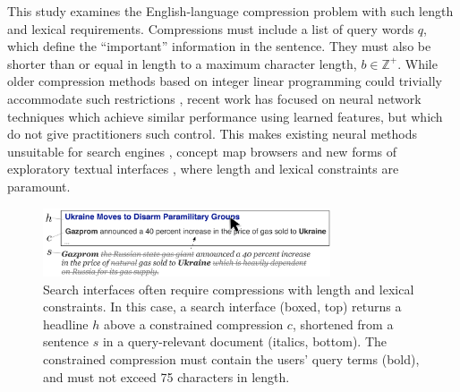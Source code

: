 \documentclass[11pt,a4paper]{article}
\begin{document}
This study examines the English-language compression problem with such length and lexical requirements. Compressions must include a list of query words $q$, which define the ``important'' information in the sentence. They must also be shorter than or equal in length to a maximum character length, $b \in \mathbb{Z}^{+}$. While older compression methods based on integer linear programming could trivially accommodate such restrictions \cite{clarke2008global,filippova2013overcoming}, recent work has focused on neural network techniques \cite{filippova2015sentence} which achieve similar performance using learned features, but which do not give practitioners such control. This makes existing neural methods unsuitable for search engines \cite{hearst2009search}, concept map browsers \cite{falke2017graphdocexplore} and new forms of exploratory textual interfaces \cite{marchionini2006exploratory}, where length and lexical constraints are paramount. 

\begin{figure}[htb!]
\includegraphics[width=8.5cm]{qf.pdf}
\caption{Search interfaces often require compressions with length and lexical constraints. In this case, a search interface (boxed, top) returns a headline $h$ above a constrained compression $c$, shortened from a sentence $s$ in a query-relevant document (italics, bottom). The constrained compression must contain the users' query terms (bold), and must not exceed 75 characters in length.}
\label{f:qf}
\end{figure}
\end{document}
